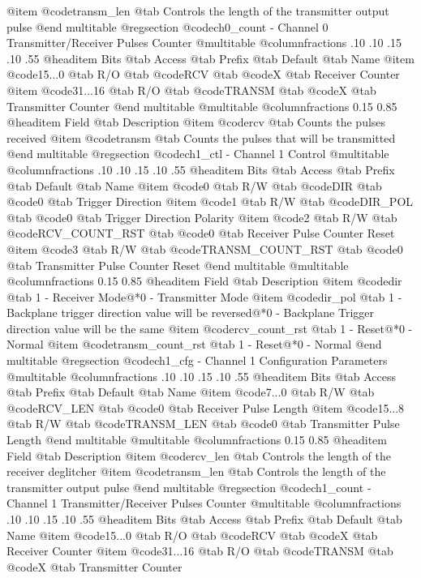 @item @code{transm_len} @tab Controls the length of the transmitter output pulse
@end multitable
@regsection @code{ch0_count} - Channel 0 Transmitter/Receiver Pulses Counter
@multitable @columnfractions .10 .10 .15 .10 .55
@headitem Bits @tab Access @tab Prefix @tab Default @tab Name
@item @code{15...0}
@tab R/O @tab
@code{RCV}
@tab @code{X} @tab 
Receiver Counter
@item @code{31...16}
@tab R/O @tab
@code{TRANSM}
@tab @code{X} @tab 
Transmitter Counter
@end multitable
@multitable @columnfractions 0.15 0.85
@headitem Field @tab Description
@item @code{rcv} @tab Counts the pulses received
@item @code{transm} @tab Counts the pulses that will be transmitted
@end multitable
@regsection @code{ch1_ctl} - Channel 1 Control
@multitable @columnfractions .10 .10 .15 .10 .55
@headitem Bits @tab Access @tab Prefix @tab Default @tab Name
@item @code{0}
@tab R/W @tab
@code{DIR}
@tab @code{0} @tab 
Trigger Direction
@item @code{1}
@tab R/W @tab
@code{DIR_POL}
@tab @code{0} @tab 
Trigger Direction Polarity
@item @code{2}
@tab R/W @tab
@code{RCV_COUNT_RST}
@tab @code{0} @tab 
Receiver Pulse Counter Reset
@item @code{3}
@tab R/W @tab
@code{TRANSM_COUNT_RST}
@tab @code{0} @tab 
Transmitter Pulse Counter Reset
@end multitable
@multitable @columnfractions 0.15 0.85
@headitem Field @tab Description
@item @code{dir} @tab 1 - Receiver Mode@*0 - Transmitter Mode
@item @code{dir_pol} @tab 1 - Backplane trigger direction value will be reversed@*0 - Backplane Trigger direction value will be the same
@item @code{rcv_count_rst} @tab 1 - Reset@*0 - Normal
@item @code{transm_count_rst} @tab 1 - Reset@*0 - Normal
@end multitable
@regsection @code{ch1_cfg} - Channel 1 Configuration Parameters
@multitable @columnfractions .10 .10 .15 .10 .55
@headitem Bits @tab Access @tab Prefix @tab Default @tab Name
@item @code{7...0}
@tab R/W @tab
@code{RCV_LEN}
@tab @code{0} @tab 
Receiver Pulse Length
@item @code{15...8}
@tab R/W @tab
@code{TRANSM_LEN}
@tab @code{0} @tab 
Transmitter Pulse Length
@end multitable
@multitable @columnfractions 0.15 0.85
@headitem Field @tab Description
@item @code{rcv_len} @tab Controls the length of the receiver deglitcher
@item @code{transm_len} @tab Controls the length of the transmitter output pulse
@end multitable
@regsection @code{ch1_count} - Channel 1 Transmitter/Receiver Pulses Counter
@multitable @columnfractions .10 .10 .15 .10 .55
@headitem Bits @tab Access @tab Prefix @tab Default @tab Name
@item @code{15...0}
@tab R/O @tab
@code{RCV}
@tab @code{X} @tab 
Receiver Counter
@item @code{31...16}
@tab R/O @tab
@code{TRANSM}
@tab @code{X} @tab 
Transmitter Counter
